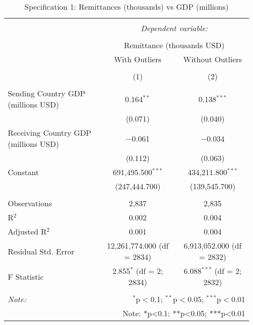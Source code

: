 
\begin{table}[!htbp] \centering 
  \caption{Specification 1: Remittances (thousands) vs GDP (millions)} 
  \label{} 
\begin{tabular}{@{\extracolsep{5pt}}lcc} 
\\[-1.8ex]\hline 
\hline \\[-1.8ex] 
 & \multicolumn{2}{c}{\textit{Dependent variable:}} \\ 
\cline{2-3} 
\\[-1.8ex] & \multicolumn{2}{c}{Remittance (thousands USD)} \\ 
 & With Outliers & Without Outliers \\ 
\\[-1.8ex] & (1) & (2)\\ 
\hline \\[-1.8ex] 
 Sending Country GDP (millions USD) & 0.164$^{**}$ & 0.138$^{***}$ \\ 
  & (0.071) & (0.040) \\ 
  Receiving Country GDP (millions USD) & $-$0.061 & $-$0.034 \\ 
  & (0.112) & (0.063) \\ 
  Constant & 691,495.500$^{***}$ & 434,211.800$^{***}$ \\ 
  & (247,444.700) & (139,545.700) \\ 
 \hline \\[-1.8ex] 
Observations & 2,837 & 2,835 \\ 
R$^{2}$ & 0.002 & 0.004 \\ 
Adjusted R$^{2}$ & 0.001 & 0.004 \\ 
Residual Std. Error & 12,261,774.000 (df = 2834) & 6,913,052.000 (df = 2832) \\ 
F Statistic & 2.855$^{*}$ (df = 2; 2834) & 6.088$^{***}$ (df = 2; 2832) \\ 
\hline 
\hline \\[-1.8ex] 
\textit{Note:}  & \multicolumn{2}{r}{$^{*}$p$<$0.1; $^{**}$p$<$0.05; $^{***}$p$<$0.01} \\ 
 & \multicolumn{2}{r}{Note: *p<0.1; **p<0.05; ***p<0.01} \\ 
\end{tabular} 
\end{table} 

